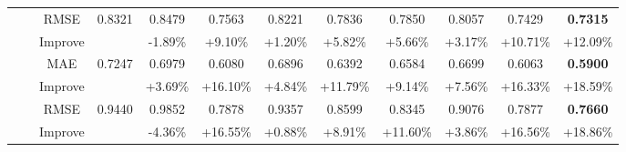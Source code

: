 \begin{table*}[t]
{\begin{tabular}{|c|c|c||c|c|c|c|c|c||c|c||c|}
\cline{3-12}
\multirow{16}{*}{} &\multirow{4}{*}{}& {RMSE} & {0.8321} & {0.8479} & {0.7563} & {0.8221} & {0.7836} &  {0.7850} & {0.8057} & {0.7429} &{\textbf{0.7315}} \\
\multirow{16}{*}{} &\multirow{4}{*}{}& {Improve} & {} & {-1.89\%} & {+9.10\%} & {+1.20\%} & {+5.82\%}  & {+5.66\%} & {+3.17\%} &{+10.71\%} & {+12.09\%} \\
\cline{2-12}
\multirow{16}{*}{} &\multirow{4}{*}{}\multirow{4}{*}{20\%} & {MAE}& {0.7247}& {0.6979} & {0.6080} & {0.6896} & {0.6392} &  {0.6584} & {0.6699} & {0.6063} &{\textbf{0.5900}} \\
\multirow{16}{*}{} &\multirow{4}{*}{}& {Improve} & {} & {+3.69\%} & {+16.10\%} & {+4.84\%} & {+11.79\%}  & {+9.14\%} & {+7.56\%} &{+16.33\%} & {+18.59\%} \\
\cline{3-12}
\multirow{16}{*}{} &\multirow{4}{*}{}& {RMSE} & {0.9440} & {0.9852} & {0.7878} & {0.9357} & {0.8599} &  {0.8345} & {0.9076} & {0.7877}  &{\textbf{0.7660}}\\
\multirow{16}{*}{} &\multirow{4}{*}{}& {Improve} & {} & {-4.36\%} & {+16.55\%} & {+0.88\%} & {+8.91\%}  & {+11.60\%} & {+3.86\%} &{+16.56\%}& {+18.86\%} \\



\end{tabular}}
\end{table*}
